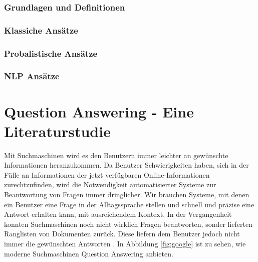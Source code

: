 \documentclass[
        ngerman,
        paper=a4,
        numbers=noendperiod,
]{scrreprt}
\begin{document}
\subsection{Grundlagen und Definitionen}
\subsection{Klassiche Ansätze}
\subsection{Probalistische Ansätze}
\subsection{NLP Ansätze}

\chapter{Question Answering - Eine Literaturstudie} 

    
Mit Suchmaschinen wird es den Benutzern immer leichter an gewünschte Informationen heranzukommen. Da Benutzer Schwierigkeiten haben, sich in der Fülle an Informationen der jetzt verfügbaren Online-Informationen zurechtzufinden, wird die Notwendigkeit automatisierter Systeme zur Beantwortung von Fragen immer dringlicher. Wir brauchen Systeme, mit denen ein Benutzer eine Frage in der Alltagssprache stellen und schnell und präzise eine Antwort erhalten kann, mit ausreichendem Kontext. In der Vergangenheit konnten Suchmaschinen noch nicht wirklich Fragen beantworten, sonder lieferten Ranglisten von Dokumenten zurück. Diese liefern dem Benutzer jedoch nicht immer die gewünschten Antworten \citep[S. 275]{Hirschman2001NaturalHere}. In Abbildung \ref{fig:google} ist zu sehen, wie moderne Suchmaschinen Question Answering anbieten.
\end{document}

